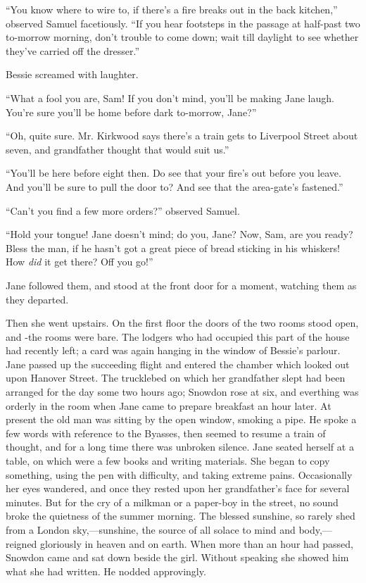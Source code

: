 ``You know where to wire to, if there's a fire breaks out in the back
kitchen,'' observed Samuel facetiously. ``If you hear footsteps
{\protect\hypertarget{239}{}{}}in the passage at half-past two to-morrow
morning, don't trouble to come down; wait till daylight to see whether
they've carried off the dresser.''

Bessie screamed with laughter.

``What a fool you are, Sam! If you don't mind, you'll be making Jane
laugh. You're sure you'll be home before dark to-morrow, Jane?''

``Oh, quite sure. Mr. Kirkwood says there's a train gets to Liverpool
Street about seven, and grandfather thought that would suit us.''

``You'll be here before eight then. Do see that your fire's out before
you leave. And you'll be sure to pull the door to? And see that the
area-gate's fastened.''

``Can't you find a few more orders?'' observed Samuel.

``Hold your tongue! Jane doesn't mind; do you, Jane? Now, Sam, are you
ready? Bless the man, if he hasn't got a great piece of bread sticking
in his whiskers! How \emph{did} it get there? Off you go!''

{\protect\hypertarget{240}{}{}}Jane followed them, and stood at the
front door for a moment, watching them as they departed.

Then she went upstairs. On the first floor the doors of the two rooms
stood open, and -the rooms were bare. The lodgers who had occupied this
part of the house had recently left; a card was again hanging in the
window of Bessie's parlour. Jane passed up the succeeding flight and
entered the chamber which looked out upon Hanover Street. The trucklebed
on which her grandfather slept had been arranged for the day some two
hours ago; Snowdon rose at six, and everthing was orderly in the room
when Jane came to prepare breakfast an hour later. At present the old
man was sitting by the open window, smoking a pipe. He spoke a few words
with reference to the Byasses, then seemed to resume a train of thought,
and for a long time there was unbroken silence. Jane seated herself at a
table, on which were a few books and writing materials. She began to
copy something, using the pen with difficulty, and taking extreme
{\protect\hypertarget{241}{}{}}pains. Occasionally her eyes wandered,
and once they rested upon her grandfather's face for several minutes.
But for the cry of a milkman or a paper-boy in the street, no sound
broke the quietness of the summer morning. The blessed sunshine, so
rarely shed from a London sky,---sunshine, the source of all solace to
mind and body,---reigned gloriously in heaven and on earth. When more
than an hour had passed, Snowdon came and sat down beside the girl.
Without speaking she showed him what she had written. He nodded
approvingly.

